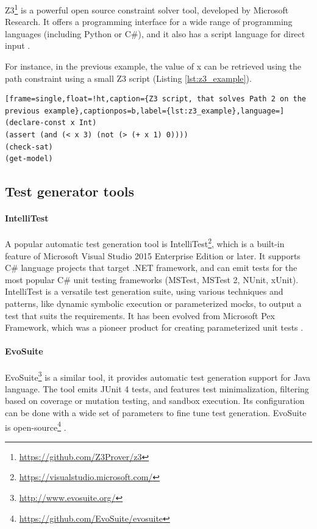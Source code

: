 Z3\footnote{\url{https://github.com/Z3Prover/z3}} is a powerful open source constraint solver tool, developed by Microsoft Research. It offers a programming interface for a wide range of programming languages (including Python or C\#), and it also has a script language for direct input \cite{z3_tutorial}.

For instance, in the previous example, the value of x can be retrieved using the path constraint using a small Z3 script (Listing \ref{lst:z3_example}).

\begin{lstlisting}[frame=single,float=!ht,caption={Z3 script, that solves Path 2 on the previous example},captionpos=b,label={lst:z3_example},language=]
(declare-const x Int)
(assert (and (< x 3) (not (> (+ x 1) 0))))
(check-sat)
(get-model)
\end{lstlisting}


\subsection{Test generator tools}

\paragraph{IntelliTest}
A popular automatic test generation tool is IntelliTest\footnote{\url{https://visualstudio.microsoft.com/}}, which is a built-in feature of Microsoft Visual Studio 2015 Enterprise Edition or later. It supports C\# language projects that target .NET framework, and can emit tests for the most popular C\# unit testing frameworks (MSTest, MSTest 2, NUnit, xUnit). IntelliTest is a versatile test generation suite, using various techniques and patterns, like dynamic symbolic execution or parameterized mocks, to output a test that suits the requirements. It has been evolved from Microsoft Pex Framework, which was a pioneer product for creating parameterized unit tests \cite{advances-in-unit-testing-theory-and-practice, intellitest_manual}.  
\paragraph{EvoSuite}
EvoSuite\footnote{\url{http://www.evosuite.org/}} is a similar tool, it provides automatic test generation support for Java language. The tool emits JUnit 4 tests, and features test minimalization, filtering based on coverage or mutation testing, and sandbox execution. Its configuration can be done with a wide set of parameters to fine tune test generation. EvoSuite is open-source\footnote{\url{https://github.com/EvoSuite/evosuite}}  \cite{aron_autom}.
